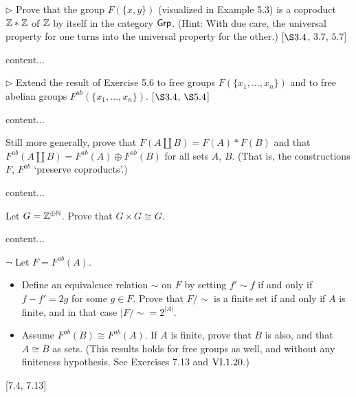 \begin{exercise}
	$\triangleright$ Prove that the group $F(\{x,y\})$ (visualized in Example 5.3) is a coproduct $\mathbb{Z}\ast \mathbb{Z}$ of $\mathbb{Z}$ by itself in the category $\textsf{Grp}$. (Hint: With due care, the universal property for one turns into the universal property for the other.) [$\S 3.4$, $3.7$, $5.7$]
\end{exercise}
\begin{solution}
	content...
\end{solution}

\begin{exercise}
	$\triangleright$ Extend the result of Exercise 5.6 to free groups $F(\{x_1,\ldots, x_n\})$ and to free abelian groups $F^{ab}(\{x_1,\ldots,x_n\})$. [$\S 3.4$, $\S 5.4$]
\end{exercise}
\begin{solution}
	content...
\end{solution}

\begin{exercise}
	Still more generally, prove that $F(A \amalg B) = F(A) \ast F(B)$ and that $F^{ab}(A\amalg B) = F^{ab}(A)\oplus F^{ab}(B)$ for all sets $A$, $B$. (That is, the constructions $F$, $F^{ab}$ `preserve coproducts'.) 
\end{exercise}
\begin{solution}
	content...
\end{solution}

\begin{exercise}
	Let $G = \mathbb{Z}^{\oplus\mathbb{N}}$. Prove that $G\times G \cong G$.
\end{exercise}
\begin{solution}
	content...
\end{solution}

\begin{exercise}
	$\neg$ Let $F = F^{ab}(A)$.
	\begin{itemize}[leftmargin=16pt]%
		\item Define an equivalence relation $\sim$ on $F$ by setting $f'\sim f$ if and only if $f-f' = 2g$ for some $g\in F$. Prove that $F/{\sim}$ is a finite set if and only if $A$ is finite, and in that case $|F/{\sim} = 2^{|A|}$.
		\item Assume $F^{ab}(B) \cong F^{ab}(A)$. If $A$ is finite, prove that $B$ is also, and that $A \cong B$ as sets. (This results holds for free groups as well, and without any finiteness hypothesis. See Exercises 7.13 and $\RNo{6}.1.20$.)
	\end{itemize}
	[7.4, 7.13]
\end{exercise}